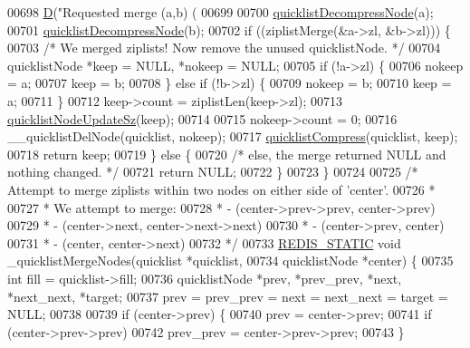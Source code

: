 \begin{DoxyCode}
{00698     \hyperlink{debugmacro_8h_a74021f021dcdfbb22891787b79c5529d}{D}(\textcolor{stringliteral}{"Requested merge (a,b) (%
00699 
00700     \hyperlink{quicklist_8c_ad36c703b3140d19a69301890a903f890}{quicklistDecompressNode}(a);
00701     \hyperlink{quicklist_8c_ad36c703b3140d19a69301890a903f890}{quicklistDecompressNode}(b);
00702     \textcolor{keywordflow}{if} ((ziplistMerge(&a->zl, &b->zl))) \{
00703         \textcolor{comment}{/* We merged ziplists! Now remove the unused quicklistNode. */}
00704         quicklistNode *keep = NULL, *nokeep = NULL;
00705         \textcolor{keywordflow}{if} (!a->zl) \{
00706             nokeep = a;
00707             keep = b;
00708         \} \textcolor{keywordflow}{else} \textcolor{keywordflow}{if} (!b->zl) \{
00709             nokeep = b;
00710             keep = a;
00711         \}
00712         keep->count = ziplistLen(keep->zl);
00713         \hyperlink{quicklist_8c_a03a3947a9423d234923343702619c553}{quicklistNodeUpdateSz}(keep);
00714 
00715         nokeep->count = 0;
00716         \_\_quicklistDelNode(quicklist, nokeep);
00717         \hyperlink{quicklist_8c_a4711a946d258d25f4bedace1458a2a1c}{quicklistCompress}(quicklist, keep);
00718         \textcolor{keywordflow}{return} keep;
00719     \} \textcolor{keywordflow}{else} \{
00720         \textcolor{comment}{/* else, the merge returned NULL and nothing changed. */}
00721         \textcolor{keywordflow}{return} NULL;
00722     \}
00723 \}
00724 
00725 \textcolor{comment}{/* Attempt to merge ziplists within two nodes on either side of 'center'.}
00726 \textcolor{comment}{ *}
00727 \textcolor{comment}{ * We attempt to merge:}
00728 \textcolor{comment}{ *   - (center->prev->prev, center->prev)}
00729 \textcolor{comment}{ *   - (center->next, center->next->next)}
00730 \textcolor{comment}{ *   - (center->prev, center)}
00731 \textcolor{comment}{ *   - (center, center->next)}
00732 \textcolor{comment}{ */}
00733 \hyperlink{quicklist_8c_a9c22c9c899458021930a552a4f94d317}{REDIS\_STATIC} \textcolor{keywordtype}{void} \_quicklistMergeNodes(quicklist *quicklist,
00734                                        quicklistNode *center) \{
00735     \textcolor{keywordtype}{int} fill = quicklist->fill;
00736     quicklistNode *prev, *prev\_prev, *next, *next\_next, *target;
00737     prev = prev\_prev = next = next\_next = target = NULL;
00738 
00739     \textcolor{keywordflow}{if} (center->prev) \{
00740         prev = center->prev;
00741         \textcolor{keywordflow}{if} (center->prev->prev)
00742             prev\_prev = center->prev->prev;
00743     \}
}}
\end{DoxyCode}

